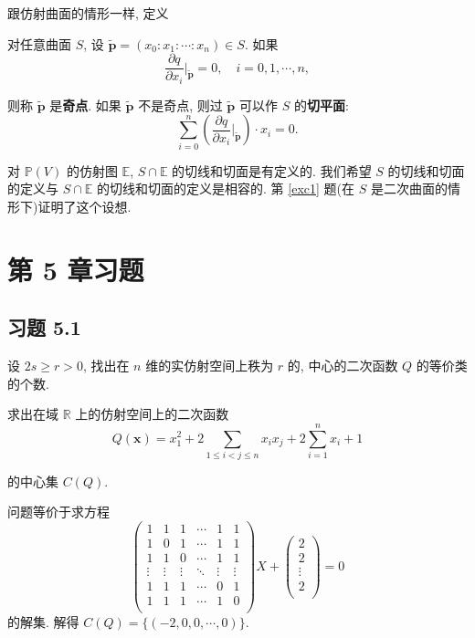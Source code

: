 \documentclass[color=black,device=normal,lang=cn,mode=geye]{elegantnote}
\begin{document}
跟仿射曲面的情形一样, 定义
\begin{definition}
    对任意曲面 $S$, 设 $\tilde{\boldsymbol{p}}=(x_0:x_1:\cdots:x_n)\in S$. 如果
    \[\dfrac{\partial q}{\partial x_i}\Bigg|_{\tilde{\boldsymbol{p}}}=0,\quad i=0,1,\cdots,n,\]

    则称 $\tilde{\boldsymbol{p}}$ 是\textbf{奇点}. 如果 $\tilde{\boldsymbol{p}}$ 不是奇点, 则过 $\tilde{\boldsymbol{p}}$ 可以作 $S$ 的\textbf{切平面}:
    \[\sum\limits_{i=0}^n\left(\dfrac{\partial q}{\partial x_i}\bigg|_{\tilde{\boldsymbol{p}}}\right)\cdot x_i=0.\]
\end{definition}


对 $\mathbb{P}(V)$ 的仿射图 $\mathbb{E}$, $S\cap\mathbb{E}$ 的切线和切面是有定义的. 我们希望 $S$ 的切线和切面的定义与 $S\cap\mathbb{E}$ 的切线和切面的定义是相容的. 第 \ref{exc1} 题(在 $S$ 是二次曲面的情形下)证明了这个设想.
\section{第 5 章习题}
\subsection{习题 5.1}
\begin{exercise}%
    设 $2s\geq r>0$, 找出在 $n$ 维的实仿射空间上秩为 $r$ 的, 中心的二次函数 $Q$ 的等价类的个数.
\end{exercise}
\begin{solution}
\end{solution}
\begin{exercise}%
    求出在域 $\mathbb{R}$ 上的仿射空间上的二次函数
    \[Q(\boldsymbol{x})=x_1^2+2\sum\limits_{1\leq i<j\leq n}x_ix_j+2\sum\limits_{i=1}^nx_i+1\]

    的中心集 $C(Q)$.
\end{exercise}
\begin{solution}
    问题等价于求方程
    \[\begin{pmatrix}
        1 & 1 & 1 & \cdots & 1 & 1 \\
        1 & 0 & 1 & \cdots & 1 & 1 \\
        1 & 1 & 0 & \cdots & 1 & 1 \\
        \vdots & \vdots & \vdots & \ddots & \vdots & \vdots \\
        1 & 1 & 1 & \cdots & 0 & 1 \\
        1 & 1 & 1 & \cdots & 1 & 0 \\
    \end{pmatrix}X+\begin{pmatrix}
        2 \\
        2 \\
        \vdots \\
        2 \\
    \end{pmatrix}=0\]
    的解集. 解得 $C(Q)=\{(-2,0,0,\cdots,0)\}$.
\end{solution}
\end{document}

